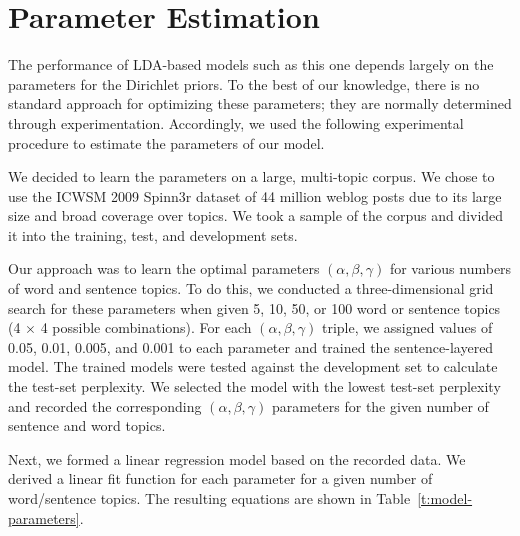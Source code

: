 \section{Parameter Estimation} \label{s:parameter-estimation} 

The performance of LDA-based models such as this one depends largely on the
parameters for the Dirichlet priors.  To the best of our knowledge, there is no
standard approach for optimizing these parameters; they are normally determined
through experimentation.  Accordingly, we used the following experimental
procedure to estimate the parameters of our model.

We decided to learn the parameters on a large, multi-topic corpus.  We chose to
use the ICWSM 2009 Spinn3r dataset of 44 million weblog posts
\cite{burton2009icwsm} due to its large size and broad coverage over topics.
We took a sample of the corpus and divided it into the training, test, and
development sets.

Our approach was to learn the optimal parameters $(\alpha, \beta, \gamma)$ for
various numbers of word and sentence topics.  To do this, we conducted a
three-dimensional grid search for these parameters when given 5, 10, 50, or 100
word or sentence topics (4 $\times$ 4 possible combinations).  For each
$(\alpha, \beta, \gamma)$ triple, we assigned values of 0.05, 0.01, 0.005, and
0.001 to each parameter and trained the sentence-layered model.  The trained
models were tested against the development set to calculate the test-set
perplexity.  We selected the model with the lowest test-set perplexity and
recorded the corresponding $(\alpha, \beta, \gamma)$ parameters for the given
number of sentence and word topics.

Next, we formed a linear regression model based on the recorded data.  We
derived a linear fit function for each parameter for a given number of
word/sentence topics.  The resulting equations are shown in
Table~\ref{t:model-parameters}.

